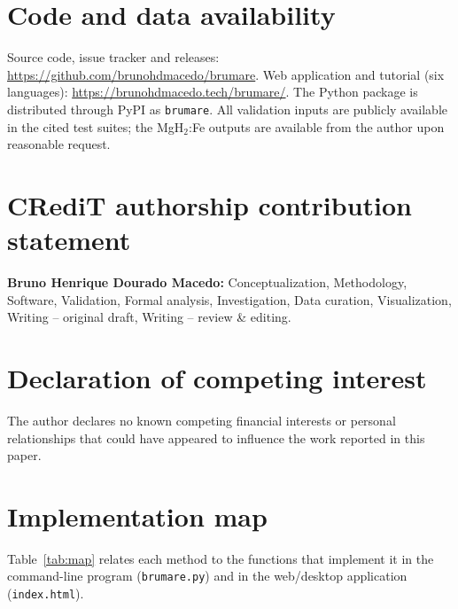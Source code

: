 \documentclass[11pt,a4paper]{article}
\newcommand{\code}[1]{\texttt{#1}}
\begin{document}
\section*{Code and data availability}
Source code, issue tracker and releases: \url{https://github.com/brunohdmacedo/brumare}. Web application and tutorial (six languages): \url{https://brunohdmacedo.tech/brumare/}. The Python package is distributed through PyPI as \code{brumare}. All validation inputs are publicly available in the cited test suites; the MgH$_2$:Fe outputs are available from the author upon reasonable request.

\section*{CRediT authorship contribution statement}
\textbf{Bruno Henrique Dourado Macedo:} Conceptualization, Methodology, Software, Validation, Formal analysis, Investigation, Data curation, Visualization, Writing – original draft, Writing – review \& editing.

\section*{Declaration of competing interest}
The author declares no known competing financial interests or personal relationships that could have appeared to influence the work reported in this paper.

\appendix
\section{Implementation map}\label{app:map}
Table~\ref{tab:map} relates each method to the functions that implement it in the command-line program (\code{brumare.py}) and in the web/desktop application (\code{index.html}).
\end{document}
